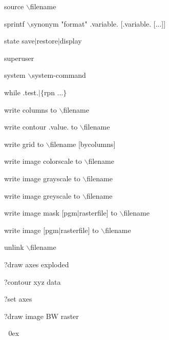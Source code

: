 source $\backslash$filename

sprintf $\backslash$synonym "format" .variable. [.variable. [...]]

state save$\mid$restore$\mid$display

superuser

system $\backslash$system-command

while .test.$\mid$$\lbrace$rpn ...$\rbrace$

write columns to $\backslash$filename

write contour .value. to $\backslash$filename

write grid to $\backslash$filename [bycolumns]

write image colorscale to $\backslash$filename

write image grayscale to $\backslash$filename

write image greyscale to $\backslash$filename

write image mask [pgm$\mid$rasterfile] to $\backslash$filename

write image [pgm$\mid$rasterfile] to $\backslash$filename

unlink $\backslash$filename

?draw axes exploded

?contour xyz data

?set axes

?draw image BW raster



\endexample
\parindent 0ex

\notice

\bye
